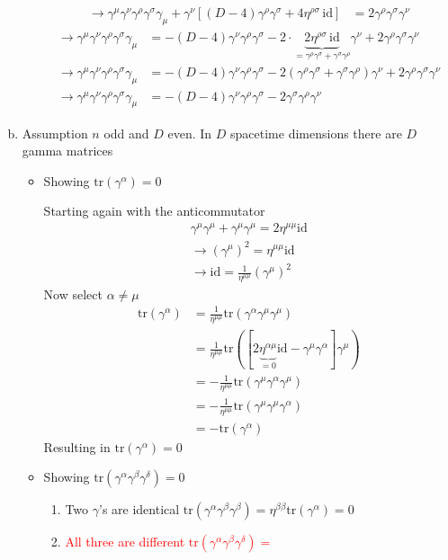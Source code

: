 \documentclass[../main.tex]{subfiles}
\begin{document}
\begin{enumerate}[a)]
\begin{itemize}
\begin{align}
\rightarrow\gamma^\mu\gamma^\nu\gamma^\rho\gamma^\sigma\gamma_\mu+\gamma^\nu\left[(D-4)\gamma^\rho\gamma^\sigma+4\eta^{\rho\sigma}\,\text{id}\right]&= 2\gamma^\rho\gamma^\sigma\gamma^\nu
\end{align}
\begin{align}
\rightarrow\gamma^\mu\gamma^\nu\gamma^\rho\gamma^\sigma\gamma_\mu&=-(D-4)\gamma^\nu\gamma^\rho\gamma^\sigma-2\cdot\underbrace{2\eta^{\rho\sigma}\,\text{id}}_{=\gamma^\rho\gamma^\sigma+\gamma^\sigma\gamma^\rho}\gamma^\nu+2\gamma^\rho\gamma^\sigma\gamma^\nu\\
\rightarrow\gamma^\mu\gamma^\nu\gamma^\rho\gamma^\sigma\gamma_\mu&=-(D-4)\gamma^\nu\gamma^\rho\gamma^\sigma-2(\gamma^\rho\gamma^\sigma+\gamma^\sigma\gamma^\rho)\gamma^\nu+2\gamma^\rho\gamma^\sigma\gamma^\nu\\
\rightarrow\gamma^\mu\gamma^\nu\gamma^\rho\gamma^\sigma\gamma_\mu&=-(D-4)\gamma^\nu\gamma^\rho\gamma^\sigma-2\gamma^\sigma\gamma^\rho\gamma^\nu
\end{align}
\end{itemize}
\item Assumption $n$ odd and $D$ even. In $D$ spacetime dimensions there are $D$ gamma matrices
\begin{itemize}
\item Showing $\text{tr}(\gamma^\alpha)=0$

Starting again with the anticommutator
\begin{align}
\gamma^\mu\gamma^\mu+\gamma^\mu\gamma^\mu=2\eta^{\mu\mu}\text{id}\\
\rightarrow(\gamma^\mu)^2=\eta^{\mu\mu}\text{id}\\
\rightarrow\text{id}=\frac{1}{\eta^{\mu\mu}}(\gamma^\mu)^2
\end{align}
Now select $\alpha\neq\mu$
\begin{align}
\text{tr}(\gamma^\alpha)
&=\frac{1}{\eta^{\mu\mu}}\text{tr}(\gamma^\alpha\gamma^\mu\gamma^\mu)\\
&=\frac{1}{\eta^{\mu\mu}}\text{tr}([2\underbrace{\eta^{\alpha\mu}}_{=0}\text{id}-\gamma^\mu\gamma^\alpha]\gamma^\mu)\\
&=-\frac{1}{\eta^{\mu\mu}}\text{tr}(\gamma^\mu\gamma^\alpha\gamma^\mu)\\
&=-\frac{1}{\eta^{\mu\mu}}\text{tr}(\gamma^\mu\gamma^\mu\gamma^\alpha)\\
&=-\text{tr}(\gamma^\alpha)
\end{align} 
Resulting in $\text{tr}(\gamma^\alpha)=0$

\item Showing $\text{tr}(\gamma^\alpha\gamma^\beta\gamma^\delta)=0$
\begin{enumerate}
\item Two $\gamma$'s are identical $\text{tr}(\gamma^\alpha\gamma^\beta\gamma^\beta)=\eta^{\beta\beta}\text{tr}(\gamma^\alpha)=0$
\item \textcolor{red}{All three are different $\text{tr}(\gamma^\alpha\gamma^\beta\gamma^\delta)=$}
\end{enumerate}


\end{itemize}
\end{enumerate}
\end{document}
